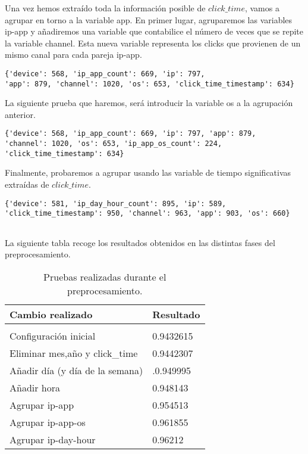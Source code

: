 Una vez hemos extraído toda la información posible de $click\_time$, vamos a agrupar en torno a la variable app.
\medskip
En primer lugar, agruparemos las variables ip-app y añadiremos una variable que contabilice el número de veces que se repite la variable channel. Esta nueva variable representa los clicks que provienen de un mismo canal para cada pareja ip-app.
\begin{verbatim}
{'device': 568, 'ip_app_count': 669, 'ip': 797, 
'app': 879, 'channel': 1020, 'os': 653, 'click_time_timestamp': 634}

\end{verbatim}
La siguiente prueba que haremos, será introducir la variable os a la agrupación anterior.
\begin{verbatim}
{'device': 568, 'ip_app_count': 669, 'ip': 797, 'app': 879, 
'channel': 1020, 'os': 653, 'ip_app_os_count': 224, 'click_time_timestamp': 634}
\end{verbatim}
Finalmente, probaremos a agrupar usando las variable de tiempo significativas extraídas de $click\_time$.
\begin{verbatim}
{'device': 581, 'ip_day_hour_count': 895, 'ip': 589, 
'click_time_timestamp': 950, 'channel': 963, 'app': 903, 'os': 660}


\end{verbatim}
\medskip
La siguiente tabla recoge los resultados obtenidos en las distintas fases del preprocesamiento.
\begin{table}[H]
	\centering
	
	\begin{tabular}{ll}
		\textbf{Cambio realizado}& \textbf{Resultado} \\
		\hline
		\\
		Configuración inicial& 0.9432615     \\
		Eliminar mes,año y click\_time& 0.9442307   \\
		Añadir día (y día de la semana)& .0.949995  \\
		Añadir hora &  0.948143\\
		Agrupar ip-app &  0.954513\\
		Agrupar ip-app-os  &0.961855 \\
		Agrupar ip-day-hour &0.96212 \\
	\end{tabular}
\caption{Pruebas realizadas durante el preprocesamiento.}
\end{table}